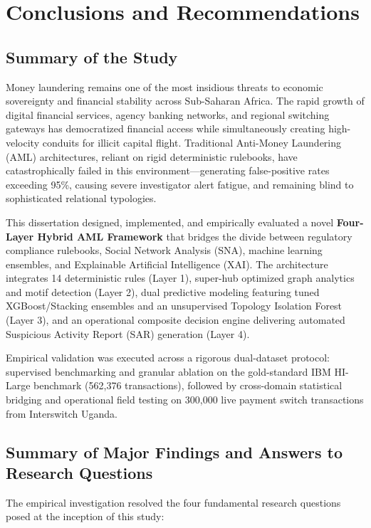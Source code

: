 \chapter{Conclusions and Recommendations} \label{ch:conclusion}

\section{Summary of the Study}
Money laundering remains one of the most insidious threats to economic sovereignty and financial stability across Sub-Saharan Africa. The rapid growth of digital financial services, agency banking networks, and regional switching gateways has democratized financial access while simultaneously creating high-velocity conduits for illicit capital flight. Traditional Anti-Money Laundering (AML) architectures, reliant on rigid deterministic rulebooks, have catastrophically failed in this environment---generating false-positive rates exceeding 95\%, causing severe investigator alert fatigue, and remaining blind to sophisticated relational typologies.

This dissertation designed, implemented, and empirically evaluated a novel \textbf{Four-Layer Hybrid AML Framework} that bridges the divide between regulatory compliance rulebooks, Social Network Analysis (SNA), machine learning ensembles, and Explainable Artificial Intelligence (XAI). The architecture integrates 14 deterministic rules (Layer 1), super-hub optimized graph analytics and motif detection (Layer 2), dual predictive modeling featuring tuned XGBoost/Stacking ensembles and an unsupervised Topology Isolation Forest (Layer 3), and an operational composite decision engine delivering automated Suspicious Activity Report (SAR) generation (Layer 4).

Empirical validation was executed across a rigorous dual-dataset protocol: supervised benchmarking and granular ablation on the gold-standard IBM HI-Large benchmark (562,376 transactions), followed by cross-domain statistical bridging and operational field testing on 300,000 live payment switch transactions from Interswitch Uganda.

\section{Summary of Major Findings and Answers to Research Questions}
The empirical investigation resolved the four fundamental research questions posed at the inception of this study:

